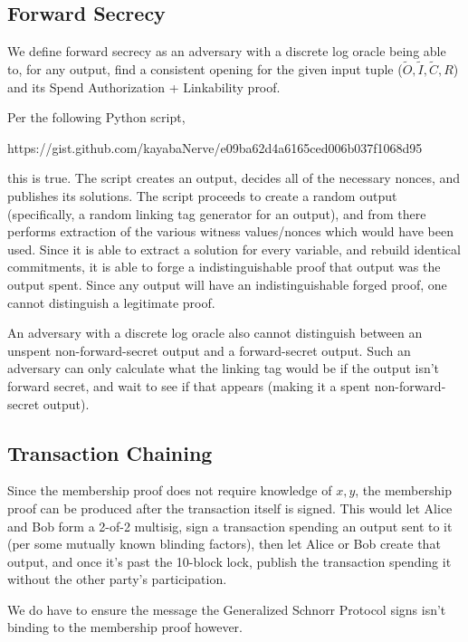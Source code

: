 \documentclass[]{article}
\begin{document}
\subsection{Forward Secrecy}

We define forward secrecy as an adversary with a discrete log oracle being able to, for any output, find a consistent opening for the given input tuple ($\tilde{O}, \tilde{I}, \tilde{C}, R$) and its Spend Authorization + Linkability proof.

Per the following Python script,

https://gist.github.com/kayabaNerve/e09ba62d4a6165ced006b037f1068d95

this is true. The script creates an output, decides all of the necessary nonces, and publishes its solutions. The script proceeds to create a random output (specifically, a random linking tag generator for an output), and from there performs extraction of the various witness values/nonces which would have been used. Since it is able to extract a solution for every variable, and rebuild identical commitments, it is able to forge a indistinguishable proof that output was the output spent. Since any output will have an indistinguishable forged proof, one cannot distinguish a legitimate proof.

An adversary with a discrete log oracle also cannot distinguish between an unspent non-forward-secret output and a forward-secret output. Such an adversary can only calculate what the linking tag would be if the output isn't forward secret, and wait to see if that appears (making it a spent non-forward-secret output).

\subsection{Transaction Chaining}

Since the membership proof does not require knowledge of $x, y$, the membership proof can be produced after the transaction itself is signed. This would let Alice and Bob form a 2-of-2 multisig, sign a transaction spending an output sent to it (per some mutually known blinding factors), then let Alice or Bob create that output, and once it's past the 10-block lock, publish the transaction spending it without the other party's participation.

We do have to ensure the message the Generalized Schnorr Protocol signs isn't binding to the membership proof however.

\newpage
\end{document}
